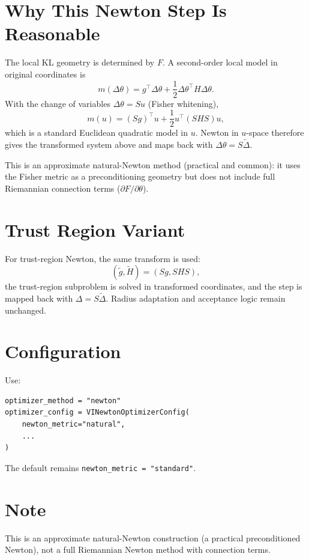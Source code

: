 \documentclass[11pt]{article}
\begin{document}
\section*{Why This Newton Step Is Reasonable}
The local KL geometry is determined by \(F\). A second-order local model in
original coordinates is
\[
m(\Delta\theta) = g^\top \Delta\theta + \frac12 \Delta\theta^\top H \Delta\theta.
\]
With the change of variables \(\Delta\theta = S u\) (Fisher whitening),
\[
m(u) = (Sg)^\top u + \frac12 u^\top (S H S) u,
\]
which is a standard Euclidean quadratic model in \(u\). Newton in \(u\)-space
therefore gives the transformed system above and maps back with
\(\Delta\theta = S\tilde\Delta\).

This is an approximate natural-Newton method (practical and common): it uses
the Fisher metric as a preconditioning geometry but does not include full
Riemannian connection terms (\(\partial F/\partial\theta\)).

\section*{Trust Region Variant}
For trust-region Newton, the same transform is used:
\[
(\tilde g,\tilde H) = (Sg,SHS),
\]
the trust-region subproblem is solved in transformed coordinates, and the step is
mapped back with \(\Delta = S\tilde\Delta\). Radius adaptation and acceptance
logic remain unchanged.

\section*{Configuration}
Use:
\begin{verbatim}
optimizer_method = "newton"
optimizer_config = VINewtonOptimizerConfig(
    newton_metric="natural",
    ...
)
\end{verbatim}
The default remains \texttt{newton\_metric = "standard"}.

\section*{Note}
This is an approximate natural-Newton construction (a practical preconditioned
Newton), not a full Riemannian Newton method with connection terms.
\end{document}
